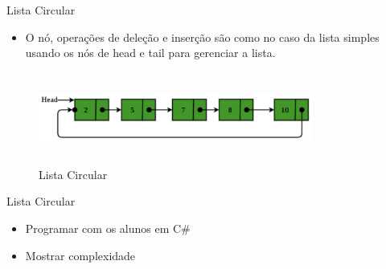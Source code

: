 \begin{frame}
	\begin{block}{Lista Circular}
	\begin{itemize}
			\item O nó, operações de deleção e inserção são como no caso da lista simples usando os nós de head e tail para gerenciar a lista.
	\end{itemize}
		\begin{figure}[!htb]
			\centering	  				
			\includegraphics[height=3cm, width = 9cm]{./pic/ListaCircular.png}
			\caption{Lista Circular}
			\label{fig_LDE_midle2}
		\end{figure}
	\end{block}
\end{frame}

\begin{frame}
	\begin{block}{Lista Circular}
	\begin{itemize}
			\item Programar com os alunos em C\#
			\item Mostrar complexidade
		\end{itemize}
	\end{block}
\end{frame}
